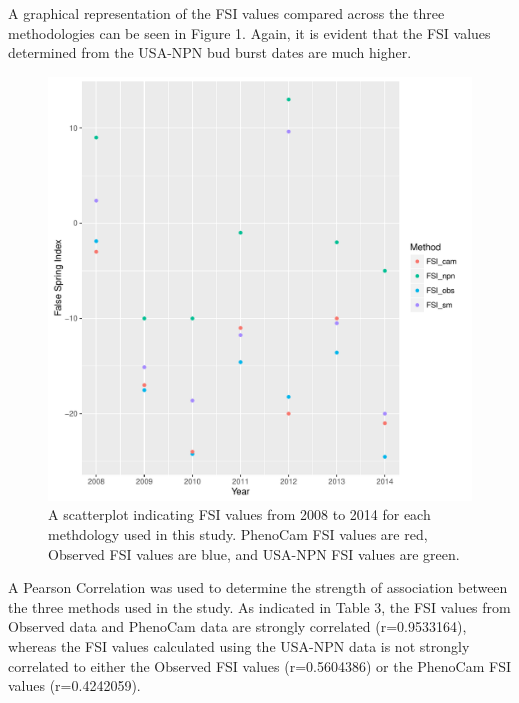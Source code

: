 \documentclass{article}\usepackage[]{graphicx}\usepackage[]{color}
\makeatletter
\def\maxwidth{ %
  \ifdim\Gin@nat@width>\linewidth
    \linewidth
  \else
    \Gin@nat@width
  \fi
}
\makeatother
\begin{document}
A graphical representation of the FSI values compared across the three methodologies can be seen in Figure 1.  Again, it is evident that the FSI values determined from the USA-NPN bud burst dates are much higher.

\begin{figure}
\includegraphics[width=\maxwidth]{figure/fsifig-1} \caption[A scatterplot indicating FSI values from 2008 to 2014 for each methdology used in this study]{A scatterplot indicating FSI values from 2008 to 2014 for each methdology used in this study. PhenoCam FSI values are red, Observed FSI values are blue, and USA-NPN FSI values are green.}\label{fig:fsifig}
\end{figure}



A Pearson Correlation was used to determine the strength of association between the three methods used in the study. As indicated in Table 3, the FSI values from Observed data and PhenoCam data are strongly correlated (r=0.9533164), whereas the FSI values calculated using the USA-NPN data is not strongly correlated to either the Observed FSI values (r=0.5604386) or the PhenoCam FSI values (r=0.4242059).
\end{document}
